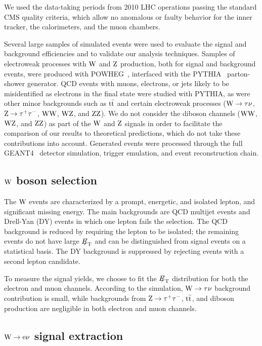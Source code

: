 \par
We used the data-taking periods from 2010 LHC operations 
passing the standard CMS quality criteria, which allow no anomalous or
faulty behavior for the inner tracker, the calorimeters,
and the muon chambers.
\par
Several large samples of simulated events were used to evaluate the signal
and background efficiencies and to validate our analysis techniques.
Samples of electroweak processes with $\mathrm{W}$ and $\mathrm{Z}$ production, both for
signal and background events, were produced with
POWHEG~\cite{Alioli:2008gx, Nason:2004rx, Frixione:2007vw},
interfaced with the PYTHIA~\cite{Sjostrand:2006za} parton-shower generator.
QCD events with muons, electrons, or jets likely to be misidentified
as electrons in the final state were studied with PYTHIA, as were other minor
backgrounds such as $\mathrm{t}\bar{\mathrm{t}}$ and certain electroweak processes
($\mathrm{W} \rightarrow \tau\nu$, $\mathrm{Z} \rightarrow \tau^+\tau^-$, $\mathrm{W}\mathrm{W}$, $\mathrm{W}\mathrm{Z}$, and $\mathrm{Z}\mathrm{Z}$).
We do not consider the diboson channels ($\mathrm{W}\mathrm{W}$, $\mathrm{W}\mathrm{Z}$, and $\mathrm{Z}\mathrm{Z}$)
as part of the $\mathrm{W}$ and $\mathrm{Z}$ signals in order to facilitate the comparison 
of our results to theoretical predictions,
which do not take these contributions into account.
Generated events were processed through the full GEANT4~\cite{GEANT4} detector 
simulation, trigger emulation, and event reconstruction chain.

\subsection{$\mathrm{W}$ boson selection}

\par
The $\mathrm{W}$ events are characterized by a prompt, energetic, and
isolated lepton, and significant missing energy.
The main backgrounds are QCD multijet events and Drell-Yan (DY)
events in which one lepton fails the selection.  The QCD background is
reduced by requiring the lepton to be isolated; the remaining
events do not have large ${E\!\!\!/}_{\mathrm{T}}$ and can be distinguished from
signal events on a statistical basis.  The DY background
is suppressed by rejecting events with a second lepton candidate.

To measure the signal yields, we choose to fit the ${E\!\!\!/}_{\mathrm{T}}$
distribution for both the electron and muon channels.
According to the simulation, $\mathrm{W} \rightarrow \tau\nu$ background contribution is small,
while backgrounds from $\mathrm{Z} \rightarrow \tau^+\tau^-$, $\mathrm{t}\bar{\mathrm{t}}$, and diboson production
are negligible in both electron and muon channels.

\subsection{$\mathrm{W} \rightarrow \mathrm{e}\nu$ signal extraction\label{sec:Wen}}

